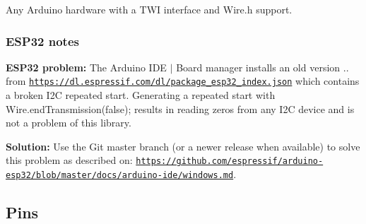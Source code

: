Any Arduino hardware with a T\+WI interface and {\ttfamily Wire.\+h} support.



\subsubsection*{E\+S\+P32 notes}

{\bfseries E\+S\+P32 problem\+:} The Arduino I\+DE $\vert$ Board manager installs an old version {..} from {\ttfamily \href{https://dl.espressif.com/dl/package_esp32_index.json}{\tt https\+://dl.\+espressif.\+com/dl/package\+\_\+esp32\+\_\+index.\+json}} which contains a broken I2C repeated start. Generating a repeated start with {\ttfamily Wire.\+end\+Transmission(false);} results in reading zero\textquotesingle{}s from any I2C device and is not a problem of this library.

{\bfseries Solution\+:} Use the Git master branch (or a newer release when available) to solve this problem as described on\+: \href{https://github.com/espressif/arduino-esp32/blob/master/docs/arduino-ide/windows.md}{\tt https\+://github.\+com/espressif/arduino-\/esp32/blob/master/docs/arduino-\/ide/windows.\+md}.

\subsection*{Pins}


